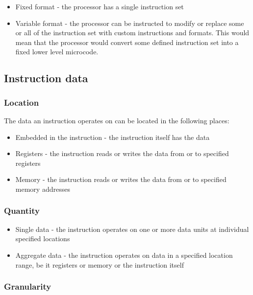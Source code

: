 \documentclass{report}
\begin{document}
\begin{itemize}
    \item{Fixed format - the processor has a single instruction set}
    \item{Variable format - the processor can be instructed to modify or replace
        some or all of the instruction set with custom instructions and
        formats. This would mean that the processor would convert some defined
        instruction set into a fixed lower level microcode.}
\end{itemize}

\subsection{Instruction data}

\subsubsection{Location}

The data an instruction operates on can be located in the following places:

\begin{itemize}
    \item{Embedded in the instruction - the instruction itself has the data}
    \item{Registers - the instruction reads or writes the data from or to
        specified registers}
    \item{Memory - the instruction reads or writes the data from or to
        specified memory addresses}
\end{itemize}

\subsubsection{Quantity}

\begin{itemize}
    \item{Single data - the instruction operates on one or more data units at
        individual specified locations}
    \item{Aggregate data - the instruction operates on data in a specified
        location range, be it registers or memory or the instruction itself}
\end{itemize}

\subsubsection{Granularity}
\end{document}
